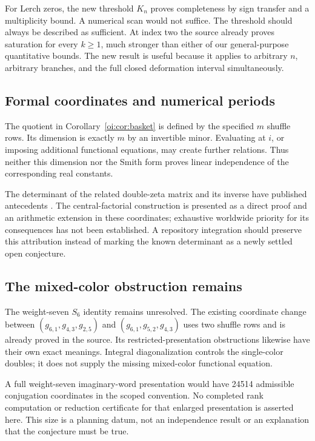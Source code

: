 \documentclass[11pt,letterpaper]{article}
\theoremstyle{definition}
\theoremstyle{remark}
\begin{document}
For Lerch zeros, the new threshold $K_n$ proves completeness by sign
transfer and a multiplicity bound. A numerical scan would not suffice.
The threshold should always be described as sufficient. At index two
the source already proves saturation for every $k\ge1$, much stronger
than either of our general-purpose quantitative bounds. The new result
is useful because it applies to arbitrary $n$, arbitrary branches, and
the full closed deformation interval simultaneously.

\subsection{Formal coordinates and numerical periods}

The quotient in Corollary~\ref{oi:cor:basket} is defined by the
specified $m$ shuffle rows. Its dimension is exactly $m$ by an invertible
minor. Evaluating at $i$, or imposing additional functional equations,
may create further relations. Thus neither this dimension nor the Smith
form proves linear independence of the corresponding real constants.

The determinant of the related double-zeta matrix and its inverse have
published antecedents \cite{Zagier,Ma,MaTeo}. The central-factorial
construction is presented as a direct proof and an arithmetic extension
in these coordinates; exhaustive worldwide priority for its consequences
has not been established. A repository integration should preserve this
attribution instead of marking the known determinant as a newly settled
open conjecture.

\subsection{The mixed-color obstruction remains}

The weight-seven $S_6$ identity remains unresolved. The existing
coordinate change between $(g_{6,1},g_{4,3},g_{2,5})$ and
$(g_{6,1},g_{5,2},g_{4,3})$ uses two shuffle rows and is already proved
in the source. Its restricted-presentation obstructions likewise have
their own exact meanings. Integral diagonalization controls the
single-color doubles; it does not supply the missing mixed-color
functional equation.

A full weight-seven imaginary-word presentation would have 24514
admissible conjugation coordinates in the scoped convention. No
completed rank computation or reduction certificate for that enlarged
presentation is asserted here. This size is a planning datum, not an
independence result or an explanation that the conjecture must be true.
\end{document}
